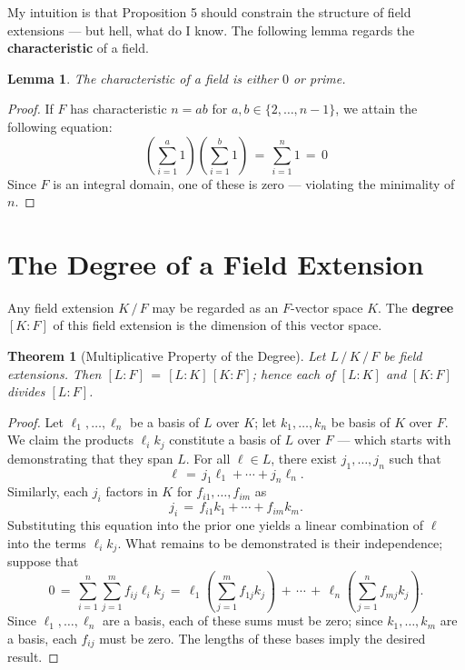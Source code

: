 \documentclass[11pt]{article}
\newtheorem{theorem}{Theorem}
\newtheorem{lemma}{Lemma}
\begin{document}
My intuition is that Proposition 5 should constrain the structure of field extensions --- but hell, what do I know. The following lemma regards the \textbf{characteristic} of a field.

\begin{adjustwidth}{0.5cm}{}
  \begin{lemma}
    The characteristic of a field is either $0$ or prime.
  \end{lemma}
  \begin{proof}
    If $F$ has characteristic $n = ab$ for $a, b \in \{ 2, \ldots, n - 1 \}$, we attain the following equation:
    \[
      \left( \sum\limits_{i = 1}^{a} 1 \right) \left( \sum\limits_{i = 1}^{b} 1 \right) \, = \, \sum\limits_{i = 1}^{n} 1 \, = \, 0
    \]
    Since $F$ is an integral domain, one of these is zero --- violating the minimality of $n$.
  \end{proof}
  \newpage
\end{adjustwidth}


\section{The Degree of a Field Extension}

Any field extension $K \, / \, F$ may be regarded as an $F$-vector space $K$. The \textbf{degree} $[K : F]$ of this field extension is the dimension of this vector space. 

\begin{adjustwidth}{0.5cm}{}
  \begin{theorem}[Multiplicative Property of the Degree]
    Let $L \, / \, K \, / \, F$ be field extensions. Then $[L : F] \, = \, [L : K] \, [K : F]$; hence each of $[L : K]$ and $[K : F]$ divides $[L : F]$.
  \end{theorem}
  \begin{proof}
    Let $\ell_{1}, \ldots, \ell_{n}$ be a basis of $L$ over $K$; let $k_{1}, \ldots, k_{n}$ be  basis of $K$ over $F$. We claim the products $\ell_{i}k_{j}$ constitute a basis of $L$ over $F$ --- which starts with demonstrating that they span $L$. For all $\ell \in L$, there exist $j_{1}, \ldots, j_{n}$ such that
    \[
      \ell \, = \, j_{1} \ell_{1} + \cdots + j_{n} \ell_{n}.
    \]
    Similarly, each $j_{i}$ factors in $K$ for $f_{i1}, \ldots, f_{im}$ as 
    \[
      j_{i} \, = \, f_{i1} k_{1} + \cdots + f_{im} k_{m}.
    \]
    Substituting this equation into the prior one yields a linear combination of $\ell$ into the terms $\ell_{i}k_{j}$. What remains to be demonstrated is their independence; suppose that
    \[
      0 \, = \, \sum\limits_{i = 1}^{n} \sum\limits_{j = 1}^{m} f_{ij} \ell_{i} k_{j} \, = \, \ell_{1} \left( \sum\limits_{j = 1}^{m} f_{1j} k_{j} \right) \, + \, \cdots \, + \, \ell_{n} \left( \sum\limits_{j = 1}^{n} f_{mj}k_{j} \right).
    \]
    Since $\ell_{1}, \ldots, \ell_{n}$ are a basis, each of these sums must be zero; since $k_{1}, \ldots, k_{m}$ are a basis, each $f_{ij}$ must be zero. The lengths of these bases imply the desired result.
  \end{proof}
\end{adjustwidth}
\end{document}

